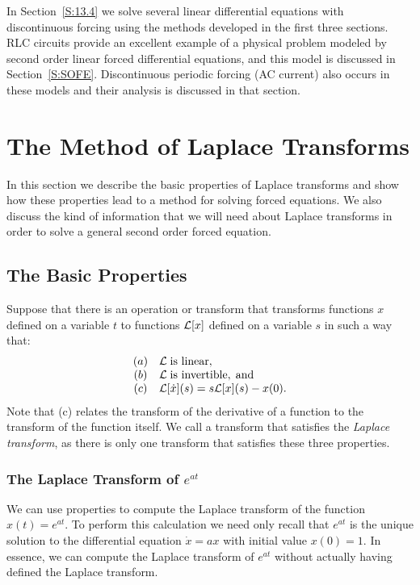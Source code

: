 \documentclass{ximera}
\begin{document}
In Section~\ref{S:13.4} we solve several linear differential equations with
discontinuous forcing using the methods developed in the first three sections. 
RLC circuits provide an excellent example of a physical problem modeled by
second order linear forced differential equations, and this model is discussed
in Section~\ref{S:SOFE}.  Discontinuous periodic forcing (AC current) also
occurs in these models and their analysis is discussed in that section.


\section{The Method of Laplace Transforms} \label{S:13.1}

In this section we describe the basic properties of Laplace transforms and 
show how these properties lead to a method for solving forced equations.   
We also discuss the kind of information that we will need about Laplace 
transforms in order to solve a general second order forced equation. 

\subsection*{The Basic Properties}

Suppose that there is an operation or transform that transforms functions $x$ 
defined on a variable $t$ to functions ${\cal L}[x]$ defined on a variable 
$s$ in such a way that:
\begin{equation}  \label{Tprops}
\begin{array}{cl}
(a) & {\cal L}\; \mbox{is linear},\\
(b) & {\cal L}\; \mbox{is invertible},\; \mbox{and}\\
(c) & {\cal L}[\dot{x}](s) = s{\cal L}[x](s) - x(0).
\end{array}
\end{equation}
Note that (c) relates the transform of the derivative of a 
function to the transform of the function itself.  We call a transform that 
satisfies  the {\em Laplace transform\/}, as there is only one 
transform that satisfies these three properties.

\subsubsection*{The Laplace Transform of $e^{at}$}

We can use properties  to compute the Laplace transform of the
function $x(t) = e^{at}$.  To perform this calculation we need only recall 
that $e^{at}$ is the unique solution to the differential equation 
$\dot{x}=ax$ with initial value $x(0)=1$.  In essence, we can compute the 
Laplace transform of $e^{at}$ without actually having defined the Laplace 
transform.
\end{document}
